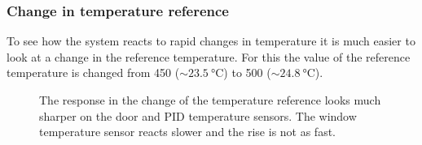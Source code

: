 \documentclass[12pt]{scrartcl}
\begin{document}
      \subsubsection{Change in temperature reference}
      To see how the system reacts to rapid changes in temperature it is much
      easier to look at a change in the reference temperature. For this the value
      of the reference temperature is changed from 450  ($\sim 23.5
      ~\text{°C}$) to 500  ($\sim 24.8~\text{°C}$). \\
      \begin{figure}[H]
        \hspace{-40pt}
        \hspace{-20pt}
        \caption{The response in the change of the temperature reference looks
        much sharper on the door and PID temperature sensors. The window temperature
        sensor reacts slower and the rise is not as fast.}
        \label{fig12}
      \end{figure}
\end{document}
